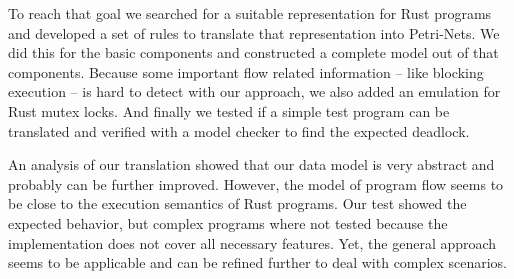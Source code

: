 To reach that goal we searched for a suitable representation for Rust programs and developed a set of rules to translate that representation into Petri-Nets.
We did this for the basic components and constructed a complete model out of that components.
Because some important flow related information -- like blocking execution -- is hard to detect with our approach, we also added an emulation for Rust mutex locks.
And finally we tested if a simple test program can be translated and verified with a model checker to find the expected deadlock.

An analysis of our translation showed that our data model is very abstract and probably can be further improved.
However, the model of program flow seems to be close to the execution semantics of Rust programs.
Our test showed the expected behavior, but complex programs where not tested because the implementation does not cover all necessary features.
Yet, the general approach seems to be applicable and can be refined further to deal with complex scenarios.
